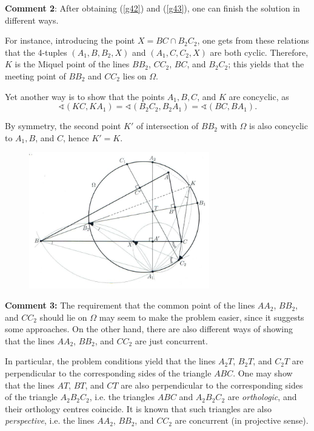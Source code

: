 \documentclass[a4paper, 12pt]{article}
\begin{document}
\begin{enumerate}
\textbf{Comment 2}:  After obtaining (\ref{g42}) and (\ref{g43}), one can finish the solution in different ways.

For instance, introducing the point $X =  BC \cap B_2 C_2$, one gets from these relations that the 4-tuples $(A_1, B, B_2, X)$ and $(A_1, C, C_2, X)$ are both cyclic. Therefore, $K$ is the Miquel point of the lines $BB_2$, $CC_2$, $BC$, and $B_2 C_2$; this yields that the meeting point of $BB_2$ and $CC_2$ lies on $\Omega$.

Yet another way is to show that the points $A_1, B, C$, and $K$ are concyclic, as
$$
\sphericalangle (KC, KA_1) = \sphericalangle(B_2 C_2, B_2 A_1) = \sphericalangle(BC, BA_1).
$$

By symmetry, the second point $K'$ of intersection of $BB_2$ with $\Omega$ is also concyclic to $A_1, B$, and $C$, hence $K' = K$.

\begin{figure}[h]
    \centering
    \includegraphics[width = 0.7\textwidth]{2018_G4_2}
\end{figure}
\vspace{4mm}

\textbf{Comment 3:}  The requirement that the common point of the lines $AA_2$, $BB_2$, and $CC_2$ should lie on $\Omega$ may seem to make the problem easier, since it suggests some approaches.  On the other hand, there are also different ways of showing that the lines $AA_2$, $BB_2$, and $CC_2$ are just concurrent.

In particular, the problem conditions yield that the lines $A_2 T$, $B_2 T$, and $C_2 T$ are perpendicular to the corresponding sides of the triangle $ABC$. One may show that the lines $AT$, $BT$, and $CT$ are also perpendicular to the corresponding sides of the triangle $A_2 B_2 C_2$, i.e. the triangles $ABC$ and $A_2 B_2 C_2$ are \textit{orthologic}, and their orthology centres coincide. It is known that such triangles are also \textit{perspective}, i.e. the lines $AA_2$, $BB_2$, and $CC_2$ are concurrent (in projective sense).


\end{enumerate}
\end{document}
